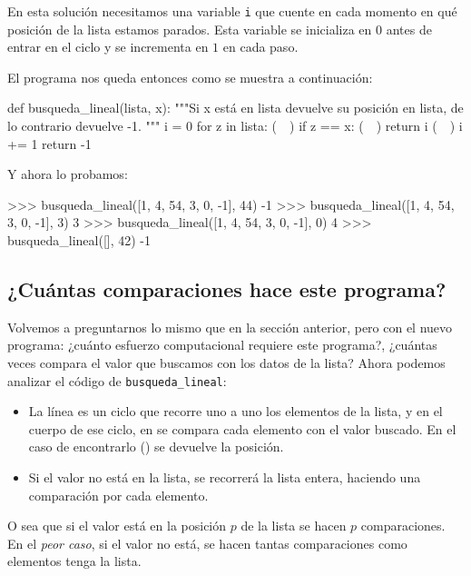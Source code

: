 En esta solución necesitamos una variable \lstinline!i! que cuente en cada
momento en qué posición de la lista estamos parados. Esta variable se
inicializa en $0$ antes de entrar en el ciclo y se incrementa en $1$ en
cada paso.

El programa nos queda entonces como se muestra a continuación:

\begin{codigo-python-sn}
def busqueda_lineal(lista, x):
    """Si x está en lista devuelve su posición en lista, de lo
    contrario devuelve -1.
    """
    i = 0
    for z in lista: (~~)
        if z == x: (~~)
            return i (~~)
        i += 1
    return -1
\end{codigo-python-sn}

Y ahora lo probamos:

\begin{codigo-python-sn}
>>> busqueda_lineal([1, 4, 54, 3, 0, -1], 44)
-1
>>> busqueda_lineal([1, 4, 54, 3, 0, -1], 3)
3
>>> busqueda_lineal([1, 4, 54, 3, 0, -1], 0)
4
>>> busqueda_lineal([], 42)
-1
\end{codigo-python-sn}

\subsection*{¿Cuántas comparaciones hace este programa?}
\label{busqueda-lineal}

Volvemos a preguntarnos lo mismo que en la sección anterior, pero con el nuevo
programa: ¿cuánto esfuerzo computacional requiere este programa?, ¿cuántas
veces compara el valor que buscamos con los datos de la lista? Ahora podemos
analizar el código de \lstinline!busqueda_lineal!:

\begin{itemize}
\item La línea  es un ciclo que recorre uno a uno los
elementos de la lista, y en el cuerpo de ese ciclo, en  se
compara cada elemento con el valor buscado. En el caso de encontrarlo
() se devuelve la posición.

\item Si el valor no está en la lista, se recorrerá la lista entera, haciendo
una comparación por cada elemento.
\end{itemize}

O sea que si el valor está en la posición $p$ de la lista se hacen $p$
comparaciones. En el \emph{peor caso}, si el valor no está, se hacen
tantas comparaciones como elementos tenga la lista.

